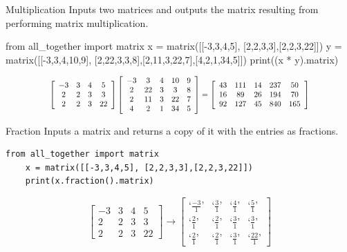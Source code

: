 \documentclass{beamer}
\begin{document}
\begin{frame}[fragile = singleslide]{Multiplication}
Inputs two matrices and outputs the matrix resulting from performing matrix multiplication.
\begin{verbnobox}[\fontsize{8pt}{8pt}\selectfont]
from all_together import matrix
    x = matrix([[-3,3,4,5], [2,2,3,3],[2,2,3,22]])
    y = matrix([[-3,3,4,10,9], [2,22,3,3,8],[2,11,3,22,7],[4,2,1,34,5]])
    print((x * y).matrix) 
\end{verbnobox}
\begin{equation*}
\scalebox{0.8}{$
\left[
    \begin{array}{cccc}
        -3 &3&4&5  \\
         2&2&3&3\\
         2&2&3&22
    \end{array}
\right]
    \left[
    \begin{array}{ccccc}
        -3 &3&4&10&9  \\
         2&22&3&3&8\\
         2&11&3&22&7\\
         4&2&1&34&5
    \end{array}
    \right] 
    =
    \left[
    \begin{array}{ccccc}
        43 &111&14&237&50  \\
         16&89&26&194&70\\
         92&127&45&840&165
    \end{array}
    \right]
$}
\end{equation*}



\end{frame}

\begin{frame}[fragile = singleslide]{Fraction}
Inputs a matrix and returns a copy of it with the entries as fractions.
\begin{verbatim}
from all_together import matrix    
    x = matrix([[-3,3,4,5], [2,2,3,3],[2,2,3,22]])
    print(x.fraction().matrix) 
\end{verbatim}
\begin{equation*}
    \left[ \begin{array}{cccc} -3&3&4&5 \\ 2&2&3&3 \\ 2&2&3&22 \end{array}\right]
    \rightarrow
    \left[
    \begin{array}{cccc}
        \text{`}\frac{-3}{1}\text{'} &\text{`}\frac{3}{1}\text{'}&\text{`}\frac{4}{1}\text{'}&\text{`}\frac{5}{1}\text{'}  \\
         \text{`}\frac{2}{1}\text{'}&\text{`}\frac{2}{1}\text{'}&\text{`}\frac{3}{1}\text{'}&\text{`}\frac{3}{1}\text{'}\\
         \text{`}\frac{2}{1}\text{'}&\text{`}\frac{2}{1}\text{'}&\text{`}\frac{3}{1}\text{'}&\text{`}\frac{22}{1}\text{'}
    \end{array}
    \right]
\end{equation*}

\end{frame}
\end{document}

